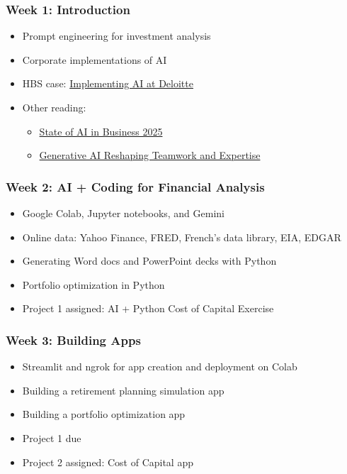 \documentclass[11pt]{article}
\begin{document}
\subsubsection*{Week 1: Introduction}
\begin{itemize}\setlength{\itemsep}{0pt}
\item Prompt engineering for investment analysis
\item Corporate implementations of AI
\item HBS case: \href{https://hbsp.harvard.edu/product/HEC382-PDF-ENG}{Implementing AI at Deloitte}
\item Other reading: 
\begin{itemize}\setlength{\itemsep}{0pt}
\item\href{https://mlq.ai/media/quarterly_decks/v0.1_State_of_AI_in_Business_2025_Report.pdf}{State of AI in Business 2025}
\item \href{https://papers.ssrn.com/sol3/papers.cfm?abstract_id=5188231}{Generative AI Reshaping Teamwork and Expertise}
\end{itemize}
\end{itemize}





\subsubsection*{Week 2: AI + Coding for Financial Analysis}
\begin{itemize}\setlength{\itemsep}{0pt}
\item Google Colab, Jupyter notebooks, and Gemini
\item Online data: Yahoo Finance, FRED, French's data library, EIA, EDGAR
\item Generating Word docs and PowerPoint decks with Python
\item Portfolio optimization in Python
\item Project 1 assigned: AI + Python Cost of Capital Exercise
\end{itemize}

\subsubsection*{Week 3: Building Apps}
\begin{itemize}\setlength{\itemsep}{0pt}
\item Streamlit and ngrok for app creation and deployment on Colab
\item Building a retirement planning simulation app
\item Building a portfolio optimization app
\item Project 1 due
\item Project 2 assigned: Cost of Capital app
\end{itemize}
\end{document}
